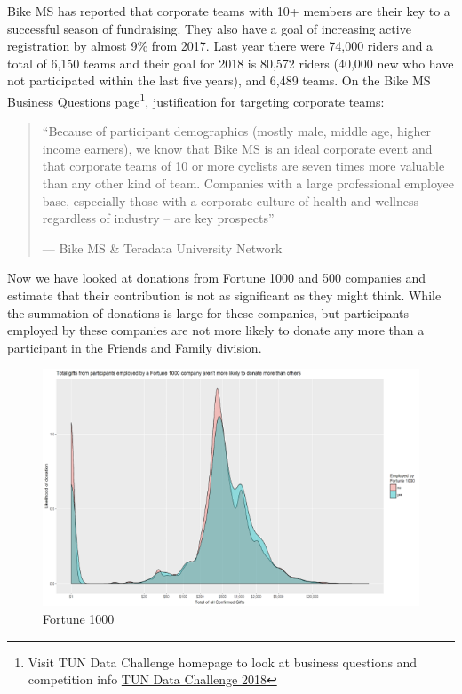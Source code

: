 \documentclass[]{article}
\let\rmarkdownfootnote\footnote%
\def\footnote{\protect\rmarkdownfootnote}
\begin{document}
Bike MS has reported that corporate teams with 10+ members are their key
to a successful season of fundraising. They also have a goal of
increasing active registration by almost 9\% from 2017. Last year there
were 74,000 riders and a total of 6,150 teams and their goal for 2018 is
80,572 riders (40,000 new who have not participated within the last five
years), and 6,489 teams. On the Bike MS Business Questions
page\footnote{Visit TUN Data Challenge homepage to look at business
  questions and competition info
  \href{http://www.teradatauniversitynetwork.com/Community/Student-Competitions/2018/Data-Challenge/Business-Questions/}{TUN
  Data Challenge 2018}}, justification for targeting corporate teams:

\begin{quote}
``Because of participant demographics (mostly male, middle age, higher
income earners), we know that Bike MS is an ideal corporate event and
that corporate teams of 10 or more cyclists are seven times more
valuable than any other kind of team. Companies with a large
professional employee base, especially those with a corporate culture of
health and wellness -- regardless of industry -- are key prospects''

\hfill --- Bike MS \& Teradata University Network
\end{quote}

Now we have looked at donations from Fortune 1000 and 500 companies and
estimate that their contribution is not as significant as they might
think. While the summation of donations is large for these companies,
but participants employed by these companies are not more likely to
donate any more than a participant in the Friends and Family division.

\begin{figure}
\centering
\includegraphics{fortune1000.png}
\caption{Fortune 1000}
\end{figure}
\end{document}
